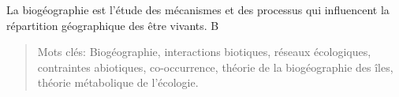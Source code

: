 La biogéographie est l'étude des mécanismes et des processus qui
influencent la répartition géographique des être vivants. B

\begin{quote}
Mots clés: Biogéographie, interactions biotiques, réseaux écologiques,
contraintes abiotiques, co-occurrence, théorie de la biogéographie des
îles, théorie métabolique de l'écologie.
\end{quote}
